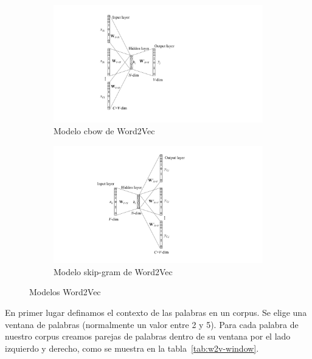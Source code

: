 \documentclass[withindex, glossary]{cam-thesis}
\begin{document}
\begin{figure}
    \centering
    \begin{subfigure}[t]{0.4\textwidth}
        \centering
        \includegraphics[width=\textwidth]{figures/fig-cbow.pdf}
        \caption{Modelo \acrshort{cbow} de Word2Vec\cite{DBLP:journals/corr/Rong14}}\label{cbow}
    \end{subfigure}
    \begin{subfigure}[t]{0.4\textwidth}
        \centering
        \includegraphics[width=\textwidth]{figures/fig-skip-gram.pdf}
        \caption{Modelo skip-gram de Word2Vec\cite{DBLP:journals/corr/Rong14}}\label{skip-gram}
    \end{subfigure}
    \caption{Modelos Word2Vec}
\end{figure}

En primer lugar definamos el contexto de las palabras en un corpus. Se elige una ventana de palabras (normalmente un valor entre 2 y 5). Para cada palabra de nuestro corpus creamos parejas de palabras dentro de su ventana por el lado izquierdo y derecho, como se muestra en la tabla~\ref{tab:w2v-window}.
\end{document}
